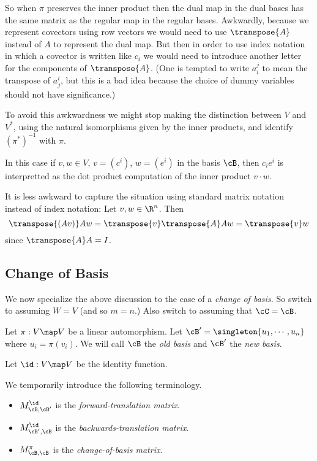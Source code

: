 \documentclass[oneside,12pt]{amsart}
\begin{document}
\begin{note}
So when $\pi$ preserves the inner product then
the dual map in the dual bases has the same matrix as the
regular map in the regular bases.
Awkwardly, because we represent covectors using row vectors we would
need to use $\transpose{A}$ instead of $A$ to represent the dual map.
But then in order to use index notation in which a covector is written like $c_i$
we would need to introduce another letter for the
components of $\transpose{A}$. (One is
tempted to write $a^j_i$ to mean the transpose of $a^i_j$, but this is a bad
idea because the choice of dummy variables should not have significance.)

To avoid this awkwardness we might stop making the distinction between
$V$ and $V^*$, using the natural isomorphisms given by
the inner products, and identify $(\pi^*)^{-1}$ with $\pi$.


In this case if $v,w \in V$, $v=(c^i)$, $w=(e^i)$ in the basis $\cB$,
then 
$c_i e^i$ is interpretted as the dot product computation of the inner product $v \cdot w $.

It is less awkward to capture the situation using standard matrix notation instead of index notation:
 Let $v,w\in\R^n$. Then
$$\transpose{(Av)}Aw = \transpose{v}\transpose{A}Aw = \transpose{v}w$$
since $\transpose{A}A = I$.
\end{note}

\subsection{Change of Basis}

We now specialize the above discussion to the case of a \emph{change of basis.}
So switch to assuming $W=V$ (and so $m=n$.) Also switch to assuming that $\cC = \cB$.

Let $\pi: V \map V$ be a linear automorphism. Let $\cB^{\prime} = \singleton{u_1,\cdots,u_n}$
where $u_i = \pi(v_i)$. We will call $\cB$ the \emph{old basis} and $\cB^{\prime}$ the
\emph{new basis.}

Let $\id:V\map V$ be the identity function.

\begin{definition}
We temporarily introduce the following terminology.

\begin{itemize}
\item $M^{\id}_{\cB,\cB^{\prime}}$ is the \emph{forward-translation matrix}.
\item $M^{\id}_{\cB^{\prime},\cB}$ is the \emph{backwards-translation matrix}.
\item $M^{\pi}_{\cB,\cB}$ is the \emph{change-of-basis matrix}.
\end{itemize}
\end{definition}
\end{document}
